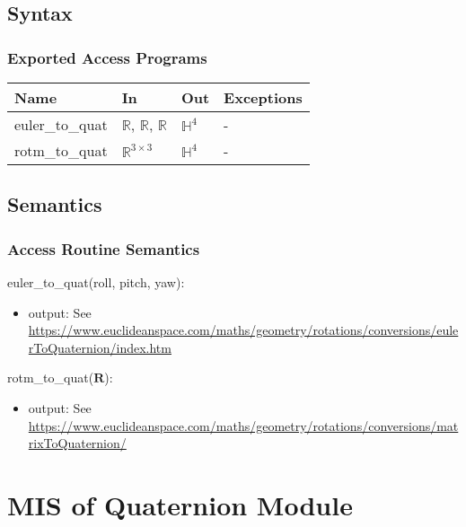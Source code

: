 \documentclass[12pt, titlepage]{article}
\begin{document}
\subsection{Syntax}

\subsubsection{Exported Access Programs}

\begin{center}
\begin{tabular}{p{4cm} p{3cm} p{2cm} p{2.5cm}}
\hline
\textbf{Name} & \textbf{In} & \textbf{Out} & \textbf{Exceptions} \\
\hline
euler\_to\_quat & $\mathbb{R}$, $\mathbb{R}$, $\mathbb{R}$ & $\mathbb{H}^4$ & - \\
rotm\_to\_quat & $\mathbb{R}^{3 \times 3}$ & $\mathbb{H}^4$ & - \\
\hline
\end{tabular}
\end{center}

\subsection{Semantics}

\subsubsection{Access Routine Semantics}

\noindent euler\_to\_quat(roll, pitch, yaw):
\begin{itemize}
\item output: See
\url{https://www.euclideanspace.com/maths/geometry/rotations/conversions/eulerToQuaternion/index.htm}
\end{itemize}

\noindent rotm\_to\_quat($\mathbf{R}$):
\begin{itemize}
\item output: See
\url{https://www.euclideanspace.com/maths/geometry/rotations/conversions/matrixToQuaternion/}
\end{itemize}


\section{MIS of Quaternion Module} \label{qm}
\end{document}
